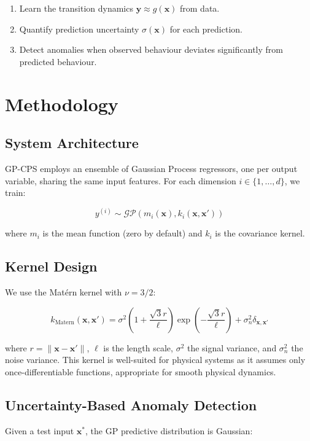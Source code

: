 \documentclass[conference]{IEEEtran}
\begin{document}
\begin{enumerate}
\item Learn the transition dynamics $\mathbf{y} \approx g(\mathbf{x})$ from data.
\item Quantify prediction uncertainty $\sigma(\mathbf{x})$ for each prediction.
\item Detect anomalies when observed behaviour deviates significantly from predicted behaviour.
\end{enumerate}

\section{Methodology}
\label{sec:method}

\subsection{System Architecture}
GP-CPS employs an ensemble of Gaussian Process regressors, one per output variable, sharing the same input features. For each dimension $i \in \{1, \dots, d\}$, we train:

\begin{equation}
y^{(i)} \sim \mathcal{GP}\left(m_i(\mathbf{x}), k_i(\mathbf{x}, \mathbf{x}')\right)
\label{eq:gp}
\end{equation}

where $m_i$ is the mean function (zero by default) and $k_i$ is the covariance kernel.

\subsection{Kernel Design}
We use the Mat\'ern kernel with $\nu = 3/2$:

\begin{equation}
k_{\text{Matern}}(\mathbf{x}, \mathbf{x}') = \sigma^2 \left(1 + \frac{\sqrt{3}r}{\ell}\right) \exp\left(-\frac{\sqrt{3}r}{\ell}\right) + \sigma_n^2 \delta_{\mathbf{x},\mathbf{x}'}
\label{eq:matern}
\end{equation}

where $r = \|\mathbf{x} - \mathbf{x}'\|$, $\ell$ is the length scale, $\sigma^2$ the signal variance, and $\sigma_n^2$ the noise variance. This kernel is well-suited for physical systems as it assumes only once-differentiable functions, appropriate for smooth physical dynamics.

\subsection{Uncertainty-Based Anomaly Detection}
Given a test input $\mathbf{x}^*$, the GP predictive distribution is Gaussian:
\end{document}
